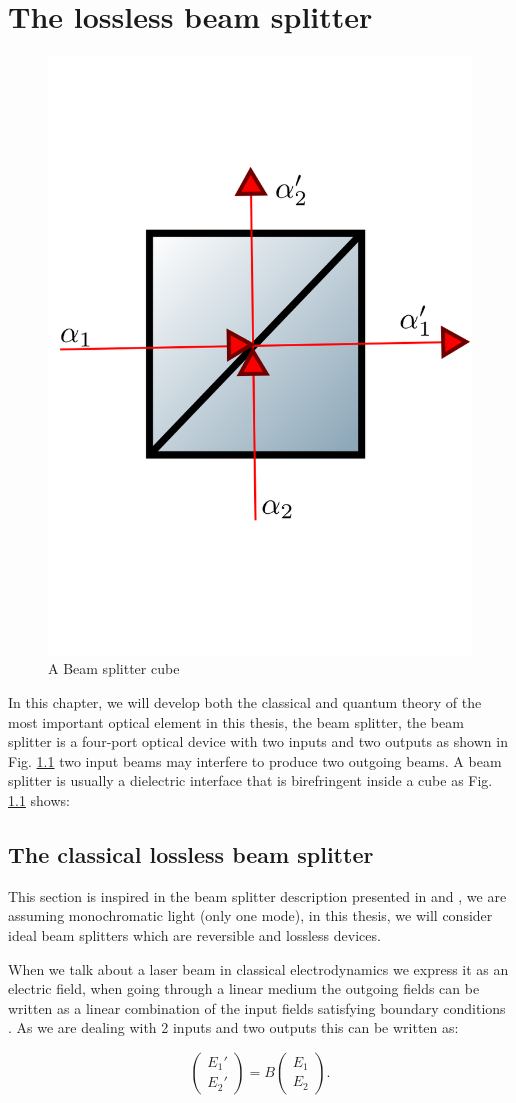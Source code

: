 \documentclass{book}
\begin{document}
\chapter{The lossless beam splitter}

\begin{figure}[h!]
\centering
\includegraphics[width=5 cm,height=5 cm]{images/bS.png}
\caption{A Beam splitter cube}
\label{fig:BS}
\end{figure}

In this chapter, we will develop both the classical and quantum theory of the most important optical element in this thesis, the beam splitter, the beam splitter is a four-port optical device with two inputs and two outputs as shown in Fig. \ref{fig:BS} two input beams may interfere to produce two outgoing beams. A beam splitter is usually a dielectric interface that is birefringent inside a cube as Fig. \ref{fig:BS} shows:

\section{The  classical lossless beam splitter}
This section is inspired in the beam splitter description presented in \cite{ludon} and \cite{leonhardt}, we are assuming monochromatic light  (only one mode), in this thesis, we will consider ideal beam splitters which are reversible and lossless devices.


When we talk about a laser beam in classical electrodynamics we express it as an electric field, when going through a linear medium the outgoing fields can be written as a linear combination of the input fields satisfying boundary conditions \cite{jackson}. As we are dealing with 2 inputs and two outputs this can be written as:

\begin{equation}
\begin{pmatrix} E_{1}' \\ E_{2}' \end{pmatrix}=B\begin{pmatrix} E_{1} \\ E_{2} \end{pmatrix}.
\end{equation}
\end{document}
